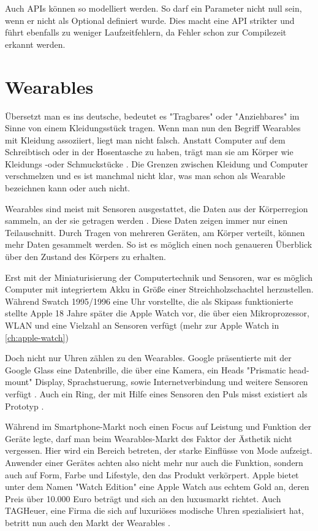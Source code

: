 Auch APIs können so modelliert werden. So darf ein Parameter nicht null sein, wenn er nicht als Optional definiert wurde. Dies macht eine API strikter und führt ebenfalls zu weniger Laufzeitfehlern, da Fehler schon zur Compilezeit erkannt werden.

\section{Wearables}
Übersetzt man es ins deutsche, bedeutet es "Tragbares" oder "Anziehbares" im Sinne von einem Kleidungsstück tragen. Wenn man nun den Begriff Wearables mit Kleidung assoziiert, liegt man nicht falsch. Anstatt Computer auf dem Schreibtisch oder in der Hosentasche zu haben, trägt man sie am Körper wie Kleidungs -oder Schmuckstücke \cite{Dvorak:2008aa}. Die Grenzen zwischen Kleidung und Computer verschmelzen und es ist manchmal nicht klar, was man schon als Wearable bezeichnen kann oder auch nicht.

Wearables sind meist mit Sensoren ausgestattet, die Daten aus der Körperregion sammeln, an der sie getragen werden \cite{4711366}. Diese Daten zeigen immer nur einen Teilauschnitt. Durch Tragen von mehreren Geräten, am Körper verteilt, können mehr Daten gesammelt werden. So ist es möglich einen noch genaueren Überblick über den Zustand des Körpers zu erhalten\cite{4711366}.

Erst mit der Miniaturisierung der Computertechnik und Sensoren, war es möglich Computer mit integriertem Akku in Größe einer Streichholzschachtel herzustellen. Während Swatch 1995/1996 eine Uhr vorstellte, die als Skipass funktionierte stellte Apple 18 Jahre später die Apple Watch vor, die über eien Mikroprozessor, WLAN und eine Vielzahl an Sensoren verfügt (mehr zur Apple Watch in \ref{ch:apple-watch})

Doch nicht nur Uhren zählen zu den Wearables. Google präsentierte mit der Google Glass eine Datenbrille, die über eine Kamera, ein Heads "Prismatic head-mount" Display, Sprachstuerung, sowie Internetverbindung und weitere Sensoren verfügt \cite{Muensterer2014281}. Auch ein Ring, der mit Hilfe eines Sensoren den Puls misst existiert als Prototyp \cite{4711366}.

Während im Smartphone-Markt noch einen Focus auf Leistung und Funktion der Geräte legte, darf man beim Wearables-Markt des Faktor der Ästhetik nicht vergessen. Hier wird ein Bereich betreten, der starke Einflüsse von Mode aufzeigt. Anwender einer Gerätes achten also nicht mehr nur auch die Funktion, sondern auch auf Form, Farbe und Lifestyle, den das Produkt verkörpert. Apple bietet unter dem Namen "Watch Edition" eine Apple Watch aus echtem Gold an, deren Preis über 10.000 Euro beträgt und sich an den luxusmarkt richtet. Auch TAGHeuer, eine Firma die sich auf luxuriöses modische Uhren spezialisiert hat, betritt nun auch den Markt der Wearables \cite{TAGHeuer:20015aa}.